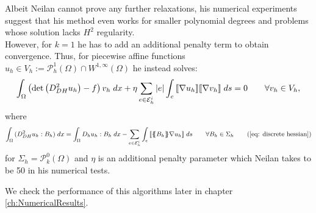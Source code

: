 Albeit Neilan cannot prove any further relaxations, his numerical experiments suggest that his method even works for smaller polynomial degrees and problems whose solution lacks $H^2$ regularity. 
\\However, for $k=1$ he has to add an additional penalty term to obtain convergence. Thus, for piecewise affine functions $u_h \in V_h :=\mathcal P_h^1(\Omega) \cap W^{1,\infty}(\Omega)$ he instead solves:
\begin{align}
		\int_{\Omega} {{ \left(\det{\left(D_{DH}^2 u_h\right)} - f \right) v_h}\;dx} 
			+ \eta \sum_{e \in \mathcal{E}_h^i} |e| \int_{e} {{ \llbracket  \nabla u_h \rrbracket \llbracket \nabla v_h \rrbracket}\;ds}
		= 0 \qquad \forall v_h \in V_h, \label{eq: neilan eq1 + jump}
\end{align}
where
	\begin{align*}
		\myIntX  \Omega { (D_{DH}^2 u_h : B_h) }
		= \myIntX  \Omega { D_h u_h: B_h}
			 -\sum_{ e \in \edgesi} \myIntS e {  \jump {\average {B_h} \nabla u_h }}\qquad \forall B_h \in \Sigma_h \tag{\ref{eq: discrete hessian}}
	\end{align*}
for $\Sigma_h = \mathcal P^0_k(\Omega)$ and $\eta$ is an additional penalty parameter which Neilan takes to be 50 in his numerical tests.

We check the performance of this algorithms later in chapter \ref{ch:NumericalResults}.
